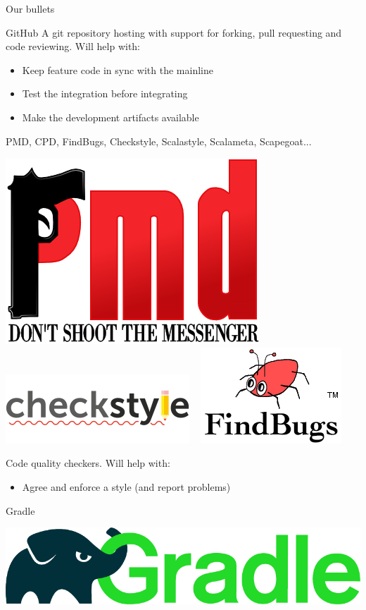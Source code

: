 \documentclass[presentation]{beamer}
\begin{document}
\begin{frame}{Our bullets}
\begin{block}{GitHub}
		A git repository hosting with support for forking, pull requesting and code reviewing. Will help with:
		\begin{itemize}
			\item Keep feature code in sync with the mainline
			\item Test the integration before integrating
			\item Make the development artifacts available
		\end{itemize}
	\end{block}
	\begin{block}{PMD, CPD, FindBugs, Checkstyle, Scalastyle, Scalameta, Scapegoat...}
		\begin{center}
			\includegraphics[height=.1\textheight]{images/pmd-logo} ~
			\includegraphics[height=.1\textheight]{images/checkstyle-logo} ~
			\includegraphics[height=.1\textheight]{images/findbugs} ~
		\end{center}
		
		Code quality checkers. Will help with:
		\begin{itemize}
			\item Agree and enforce a style (and report problems)
		\end{itemize}
	\end{block}
	\begin{block}{Gradle}
		\begin{center}
			\includegraphics[height=.1\textheight]{images/gradle-logo}
		\end{center}
		

\end{block}
\end{frame}
\end{document}

